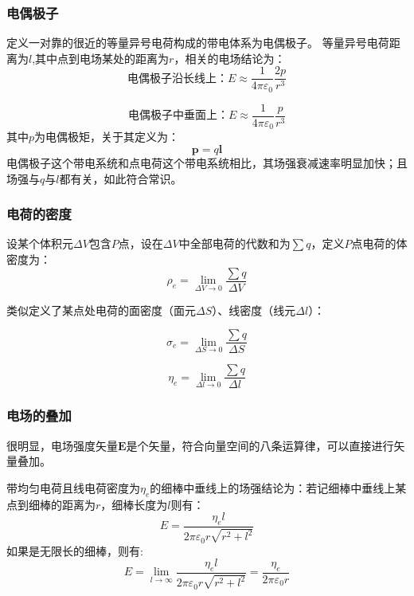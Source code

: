 \documentclass[UTF8,AutoFakeBold,b5paper]{ctexbook}
\begin{document}
\subsubsection{电偶极子}\kaishu{}
定义一对靠的很近的等量异号电荷构成的带电体系为电偶极子。
等量异号电荷距离为$l$,其中点到电场某处的距离为$r$，相关的电场结论为：
\begin{equation}
	\text{电偶极子沿长线上：}E \approx \dfrac{1}{4\pi\varepsilon_{0}}\dfrac{2p}{r^{3}}
\end{equation}

\begin{equation}
	\text{电偶极子中垂面上：}E \approx \dfrac{1}{4\pi\varepsilon_{0}}\dfrac{p}{r^{3}}
\end{equation}
其中$p$为电偶极矩，关于其定义为：
\begin{equation}
	\bm{p} = q\bm{l}
\end{equation}
\textcolor[rgb]{0.56,0.28,0.16}{电偶极子这个带电系统和点电荷这个带电系统相比，其场强衰减速率明显加快；且场强与$q$与$l$都有关，如此符合常识。}

\subsubsection{电荷的密度}
设某个体积元$ \Delta V $包含$P$点，设在$ \Delta V $中全部电荷的代数和为$\sum q$，定义$P$点电荷的体密度为：
\begin{equation}
	\rho_{e} = \lim_{\Delta V \to 0}\dfrac{\sum q}{\Delta V}
\end{equation}

类似定义了某点处电荷的面密度（面元$\Delta S$）、线密度（线元$\Delta l$）：

\begin{equation}
	\sigma_{e} = \lim_{\Delta S \to 0}\dfrac{\sum q}{\Delta S}
\end{equation}

\begin{equation}
	\eta_{e} = \lim_{\Delta l \to 0}\dfrac{\sum q}{\Delta l}
\end{equation}
\subsubsection{电场的叠加}
很明显，电场强度矢量$\bm{E}$是个矢量，符合向量空间的八条运算律，可以直接进行矢量叠加。

带均匀电荷且线电荷密度为$\eta_{e}$的细棒中垂线上的场强结论为：若记细棒中垂线上某点到细棒的距离为$r$，细棒长度为$l$则有：
\textcolor[rgb]{0.56,0.28,0.16}{\begin{equation}
	E = \dfrac{\eta_{e}l}{2\pi\varepsilon_{0}r\sqrt{r^{2}+l^{2}}}
\end{equation}}
如果是无限长的细棒，则有:
\textcolor[rgb]{0.56,0.28,0.16}{
\begin{equation}
	E = \lim_{l \to \infty}\dfrac{\eta_{e}l}{2\pi\varepsilon_{0}r\sqrt{r^{2}+l^{2}}} = \dfrac{\eta_{e}}{2\pi\varepsilon_{0}r}
\end{equation}}
\end{document}
